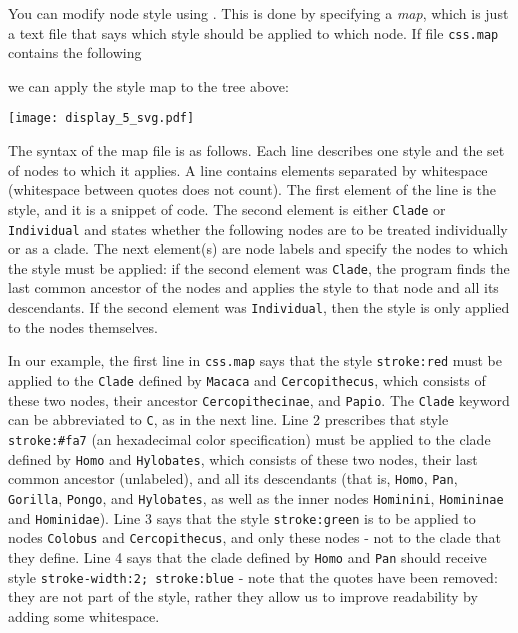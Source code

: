 You can modify node style using \css. This is done by specifying a
\textit{\css{} map}, which is just a text file that says which style should be
applied to which node. If file \texttt{css.map} contains the following
\begin{quote}  \end{quote} we can apply the style map to
the tree above:



\begin{center}
 \texttt{[image: display\_5\_svg.pdf]}
\end{center}

The syntax of the \css{} map file is as follows. Each line describes one style
and the set of nodes to which it applies. A line contains elements separated by
whitespace (whitespace between quotes does not count). The first element of the
line is the style, and it is a snippet of \css{} code. The second element is
either \texttt{Clade} or \texttt{Individual} and states whether the following
nodes are to be treated individually or as a clade. The next element(s) are
node labels and specify the nodes to which the style must be applied: if the
second element was \texttt{Clade}, the program finds the last common ancestor
of the nodes and applies the style to that node and all its descendants. If the
second element was \texttt{Individual}, then the style is only applied to the
nodes themselves.

In our example, the first line in \texttt{css.map} says that the style
\texttt{stroke:red} must be applied to the \texttt{Clade} defined by
\texttt{Macaca} and \texttt{Cercopithecus}, which consists of these two nodes,
their ancestor \texttt{Cercopithecinae}, and \texttt{Papio}. The \texttt{Clade}
keyword can be abbreviated to \texttt{C}, as in the next line. Line 2
prescribes that style \texttt{stroke:\#fa7} (an \svg{} hexadecimal color
specification) must be applied to the clade defined by \texttt{Homo} and
\texttt{Hylobates}, which consists of these two nodes, their last common
ancestor (unlabeled), and all its descendants (that is, \texttt{Homo},
\texttt{Pan}, \texttt{Gorilla}, \texttt{Pongo}, and \texttt{Hylobates}, as well
as the inner nodes \texttt{Hominini}, \texttt{Homininae} and
\texttt{Hominidae}). Line 3 says that the style \texttt{stroke:green} is to be applied to nodes \texttt{Colobus} and \texttt{Cercopithecus}, and only these nodes - not to the clade that they define. 
Line 4 says that the clade defined by \texttt{Homo} and
\texttt{Pan} should receive style \texttt{stroke-width:2;~stroke:blue} - note
that the quotes have been removed: they are not part of the style, rather they
allow us to improve readability by adding some whitespace.

